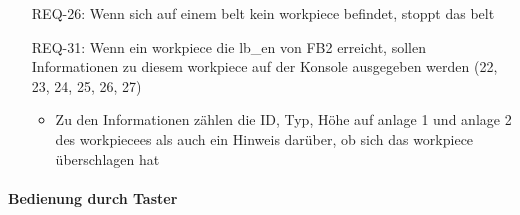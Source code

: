 \begin{itemize}
    \item[REQ-26:] Wenn sich auf einem \gls{belt} kein \gls{workpiece} befindet, stoppt das \gls{belt}
    \item[REQ-31:] Wenn ein \gls{workpiece} die \gls{lb_en} von FB2 erreicht,
    sollen Informationen zu diesem \gls{workpiece} auf der Konsole ausgegeben werden (22, 23, 24, 25, 26, 27)
    \begin{itemize}
        \item Zu den Informationen zählen die ID, Typ, Höhe auf \gls{anlage} 1 und \gls{anlage} 2 des \gls{workpiece}es als
        auch ein Hinweis darüber, ob sich das \gls{workpiece} überschlagen hat
    \end{itemize}
\end{itemize}

\paragraph{Bedienung durch Taster}
